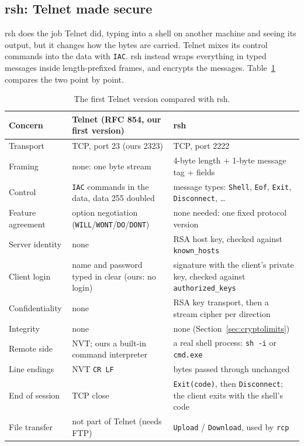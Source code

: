 \subsection{rsh: Telnet made secure}
\label{sec:rshdesign}

rsh does the job Telnet did, typing into a shell on another machine and seeing
its output, but it changes how the bytes are carried. Telnet mixes its control
commands into the data with \texttt{IAC}. rsh instead wraps everything in typed
messages inside length-prefixed frames, and encrypts the messages.
Table~\ref{tab:telnetvsrsh} compares the two point by point.

\begin{table}[H]
\centering
\footnotesize
\begin{tabularx}{\textwidth}{@{}l X X@{}}
\toprule
Concern & Telnet (RFC 854, our first version) & rsh \\
\midrule
Transport & TCP, port 23 (ours 2323) & TCP, port 2222 \\
Framing & none: one byte stream & 4-byte length + 1-byte message tag + fields \\
Control & \texttt{IAC} commands in the data, data 255 doubled & message types: \texttt{Shell}, \texttt{Eof}, \texttt{Exit}, \texttt{Disconnect}, \ldots \\
Feature agreement & option negotiation (\texttt{WILL}/\texttt{WONT}/\texttt{DO}/\texttt{DONT}) & none needed: one fixed protocol version \\
Server identity & none & RSA host key, checked against \texttt{known\_hosts} \\
Client login & name and password typed in clear (ours: no login) & signature with the client's private key, checked against \texttt{authorized\_keys} \\
Confidentiality & none & RSA key transport, then a stream cipher per direction \\
Integrity & none & none (Section~\ref{sec:cryptolimits}) \\
Remote side & NVT; ours a built-in command interpreter & a real shell process: \texttt{sh -i} or \texttt{cmd.exe} \\
Line endings & NVT \texttt{CR LF} & bytes passed through unchanged \\
End of session & TCP close & \texttt{Exit(code)}, then \texttt{Disconnect}; the client exits with the shell's code \\
File transfer & not part of Telnet (needs FTP) & \texttt{Upload} / \texttt{Download}, used by \texttt{rcp} \\
\bottomrule
\end{tabularx}
\caption{The first Telnet version compared with rsh.}
\label{tab:telnetvsrsh}
\end{table}


